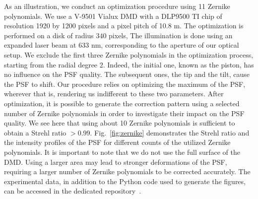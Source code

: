 \documentclass[12pt]{iopart}
\begin{document}
As an illustration, we conduct an optimization procedure using 11 Zernike polynomials.
We use a V-9501 Vialux DMD with a DLP9500 TI chip
of resolution 1920 by 1200 pixels and a pixel pitch of 10.8 \textmu m.
The optimization is performed on a disk of radius $340$ pixels,
The illumination is done using an expanded laser beam at 633 nm,
corresponding to the aperture of our optical setup.
We exclude the first three Zernike polynomials in the optimization process,
starting from the radial degree $2$.
Indeed, the initial one, known as the piston, has no influence on the PSF quality.
The subsequent ones, the tip and the tilt, cause the PSF to shift.
Our procedure relies on optimizing the maximum of the PSF, wherever that is,
rendering us indifferent to these two parameters.
After optimization,
it is possible to generate the correction pattern using a selected number of Zernike polynomials
in order to investigate their impact on the PSF quality.
We see here that using about 10 Zernike polynomials is sufficient to obtain a Strehl ratio $>0.99$.
Fig.~\ref{fig:zernike} demonstrates the Strehl ratio and the intensity profiles of the PSF
for different counts of the utilized Zernike polynomials.
It is important to note that we do not use the full surface of the DMD.
Using a larger area may lead to stronger deformations of the PSF,
requiring a larger number of Zernike polynomials to be corrected accurately.
The experimental data, in addition to the Python code used to generate the figures, can be accessed in the dedicated repository~\cite{github}.\\
\end{document}
